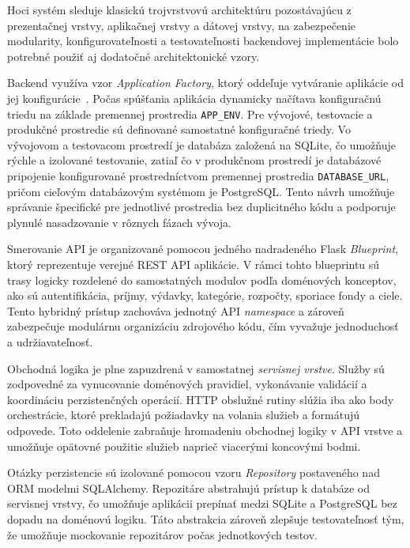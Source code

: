 Hoci systém sleduje klasickú trojvrstvovú architektúru pozostávajúcu z prezentačnej vrstvy, aplikačnej vrstvy a dátovej vrstvy, na zabezpečenie modularity, konfigurovateľnosti a testovateľnosti backendovej implementácie bolo potrebné použiť aj dodatočné architektonické vzory.

Backend využíva vzor \textit{Application Factory}, ktorý oddeľuje vytváranie aplikácie od jej konfigurácie~\cite{flask_app_factories}. Počas spúšťania aplikácia dynamicky načítava konfiguračnú triedu na základe premennej prostredia \texttt{APP\_ENV}. Pre vývojové, testovacie a produkčné prostredie sú definované samostatné konfiguračné triedy. Vo vývojovom a testovacom prostredí je databáza založená na SQLite, čo umožňuje rýchle a izolované testovanie, zatiaľ čo v produkčnom prostredí je databázové pripojenie konfigurované prostredníctvom premennej prostredia \texttt{DATABASE\_URL}, pričom cieľovým databázovým systémom je PostgreSQL. Tento návrh umožňuje správanie špecifické pre jednotlivé prostredia bez duplicitného kódu a podporuje plynulé nasadzovanie v rôznych fázach vývoja.

Smerovanie API je organizované pomocou jedného nadradeného Flask \textit{Blueprint}, ktorý reprezentuje verejné REST API aplikácie. V rámci tohto blueprintu sú trasy logicky rozdelené do samostatných modulov podľa doménových konceptov, ako sú autentifikácia, príjmy, výdavky, kategórie, rozpočty, sporiace fondy a ciele. Tento hybridný prístup zachováva jednotný API \textit{namespace} a zároveň zabezpečuje modulárnu organizáciu zdrojového kódu, čím vyvažuje jednoduchosť a udržiavateľnosť.

Obchodná logika je plne zapuzdrená v samostatnej \textit{servisnej vrstve}. Služby sú zodpovedné za vynucovanie doménových pravidiel, vykonávanie validácií a koordináciu perzistenčných operácií. HTTP obslužné rutiny slúžia iba ako body orchestrácie, ktoré prekladajú požiadavky na volania služieb a formátujú odpovede. Toto oddelenie zabraňuje hromadeniu obchodnej logiky v API vrstve a umožňuje opätovné použitie služieb naprieč viacerými koncovými bodmi.

Otázky perzistencie sú izolované pomocou vzoru \textit{Repository} postaveného nad ORM modelmi SQLAlchemy. Repozitáre abstrahujú prístup k databáze od servisnej vrstvy, čo umožňuje aplikácii prepínať medzi SQLite a PostgreSQL bez dopadu na doménovú logiku. Táto abstrakcia zároveň zlepšuje testovateľnosť tým, že umožňuje mockovanie repozitárov počas jednotkových testov.

